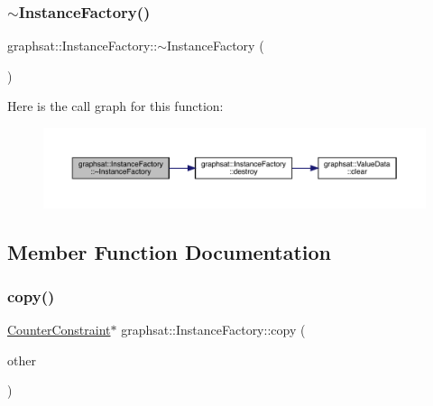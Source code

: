 \subsubsection{\texorpdfstring{$\sim$InstanceFactory()}{~InstanceFactory()}}
{\footnotesize\ttfamily graphsat\+::\+Instance\+Factory\+::$\sim$\+Instance\+Factory (\begin{DoxyParamCaption}{ }\end{DoxyParamCaption})\hspace{0.3cm}{\ttfamily [inline]}}

Here is the call graph for this function\+:
\nopagebreak
\begin{figure}[H]
\begin{center}
\leavevmode
\includegraphics[width=350pt]{classgraphsat_1_1_instance_factory_a2a267949518b2bd1a09090757fe46a79_cgraph}
\end{center}
\end{figure}


\subsection{Member Function Documentation}
\mbox{\label{classgraphsat_1_1_instance_factory_a309e53f4685517176eed7649eda1e9e7}} 
\subsubsection{\texorpdfstring{copy()}{copy()}\hspace{0.1cm}{\footnotesize\ttfamily [1/2]}}
{\footnotesize\ttfamily \mbox{\hyperlink{classgraphsat_1_1_counter_constraint}{Counter\+Constraint}}$\ast$ graphsat\+::\+Instance\+Factory\+::copy (\begin{DoxyParamCaption}\item[{\mbox{\hyperlink{classgraphsat_1_1_counter_constraint}{Counter\+Constraint}} $\ast$}]{other }\end{DoxyParamCaption})\hspace{0.3cm}{\ttfamily [inline]}}


